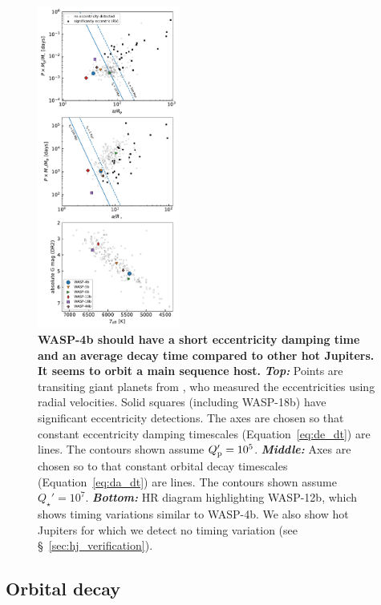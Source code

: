 \documentclass[12pt,twocolumn,tighten]{aastex62}
\begin{document}
\begin{figure}[t!]
  \begin{center}
    \includegraphics[width=0.417\textwidth]{f4.pdf}
  \end{center}
  \vspace{-0.5cm}
  \caption{
    {\bf WASP-4b should have a short eccentricity damping time and an average
    decay time compared to other hot Jupiters.  It seems to orbit a
    main sequence host.
    }
    {\bf \it Top:}
    Points are transiting giant planets from \citet{bonomo_gaps_2017},
    who measured the eccentricities using radial velocities.  Solid
    squares (including WASP-18b) have significant eccentricity
    detections.  The axes are chosen so that constant eccentricity
    damping timescales (Equation~\ref{eq:de_dt}) are lines.  The
    contours shown assume $Q_{\rm p}' = 10^5$.
    {\bf \it Middle:} 
    Axes are chosen so to that constant orbital decay timescales
    (Equation~\ref{eq:da_dt}) are lines.  The contours shown assume
    $Q_\star' = 10^7$.
    {\bf \it Bottom:}
    HR diagram highlighting WASP-12b, which shows timing variations
    similar to WASP-4b.  We also show hot Jupiters for which we
    detect no timing variation (see \S~\ref{sec:hj_verification}).
    \label{fig:context}
  }
\end{figure}

 
\subsection{Orbital decay}
\end{document}

